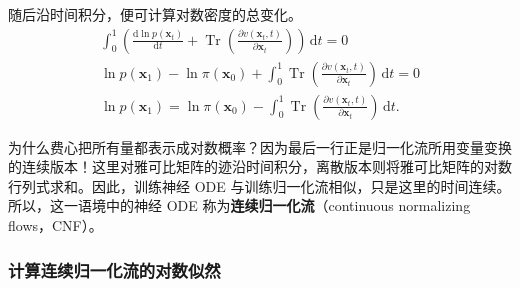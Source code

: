 随后沿时间积分，便可计算对数密度的总变化。
\begin{gather}
  \int_0^1\left(\frac{\mathrm d\ln p(\mathbf x_t)}{\mathrm dt}+
    \operatorname{Tr}\left(\frac{\partial v(\mathbf x_t,t)}{\partial\mathbf x_t}\right)\right)
    \,\mathrm dt=0
    \tag{9.52}\label{eq:09-52}\\
  \ln p(\mathbf x_1)-\ln\pi(\mathbf x_0)+
    \int_0^1\operatorname{Tr}\left(\frac{\partial v(\mathbf x_t,t)}{\partial\mathbf x_t}\right)
    \,\mathrm dt=0
    \tag{9.53}\label{eq:09-53}\\
  \ln p(\mathbf x_1)=\ln\pi(\mathbf x_0)-
    \int_0^1\operatorname{Tr}\left(\frac{\partial v(\mathbf x_t,t)}{\partial\mathbf x_t}\right)
    \,\mathrm dt.
    \tag{9.54}\label{eq:09-54}
\end{gather}

为什么费心把所有量都表示成对数概率？因为最后一行正是归一化流所用变量变换的连续版本！这里对雅可比矩阵的迹沿时间积分，离散版本则将雅可比矩阵的对数行列式求和。因此，训练神经 ODE 与训练归一化流相似，只是这里的时间连续。所以，这一语境中的神经 ODE 称为\textbf{连续归一化流}（continuous normalizing flows，CNF）。

\subsubsection{计算连续归一化流的对数似然}

